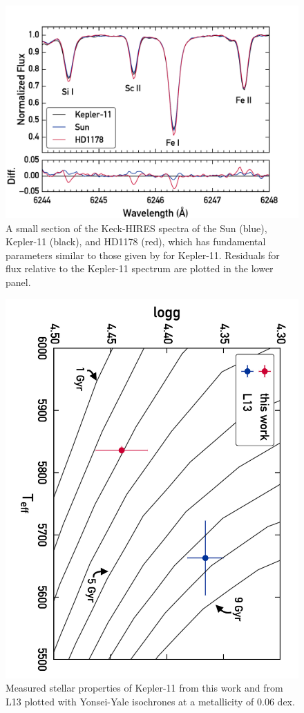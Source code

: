 \documentclass[twocolumn]{aastex61}
\begin{document}
\begin{figure}
\centering
\includegraphics[width=\columnwidth]{spec}
\caption{A small section of the Keck-HIRES spectra of the Sun (blue), Kepler-11 (black), and HD1178 (red), which has fundamental parameters similar to those given by \citet{Lissauer2013} for Kepler-11. Residuals for flux relative to the Kepler-11 spectrum are plotted in the lower panel.}
\label{fig:spec}
\end{figure}


\begin{figure}
\centering
\includegraphics[angle=270,width=\columnwidth]{isochrones_annotated}
\caption{Measured stellar properties of Kepler-11 from this work and from L13 plotted with Yonsei-Yale isochrones at a metallicity of 0.06 dex.}
\label{fig:isochrones}
\end{figure}
\end{document}
